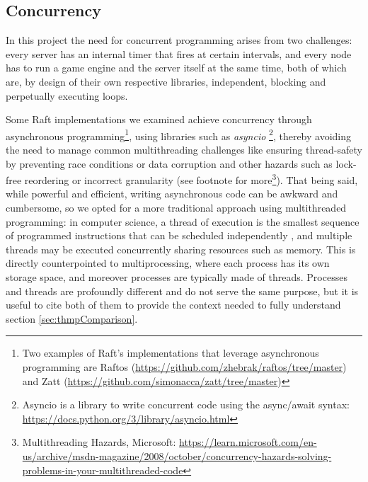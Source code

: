 \subsection{Concurrency} \label{sec:threading}

In this project the need for concurrent programming arises from two challenges: every server has an internal timer that fires at certain intervals, and every node has to run a game engine and the server itself at the same time, {both of which are, by design of their own respective libraries, independent, blocking and perpetually executing loops.}

Some Raft implementations we examined achieve concurrency through asynchronous programming\footnote{Two examples of Raft's implementations that leverage asynchronous programming are Raftos (\url{https://github.com/zhebrak/raftos/tree/master}) and Zatt (\url{https://github.com/simonacca/zatt/tree/master})}, using libraries such as \textit{asyncio} \footnote{Asyncio is a library to write concurrent code using the async/await syntax: \url{https://docs.python.org/3/library/asyncio.html}}, thereby avoiding the need to manage common multithreading challenges like ensuring thread-safety by preventing race conditions or data corruption and other hazards such as lock-free reordering or incorrect granularity (see footnote for more\footnote{Multithreading Hazards, Microsoft: \url{https://learn.microsoft.com/en-us/archive/msdn-magazine/2008/october/concurrency-hazards-solving-problems-in-your-multithreaded-code}}).
That being said, while powerful and efficient, writing asynchronous code can be awkward and cumbersome, so we opted for a more traditional approach using multithreaded programming: in computer science, a thread of execution is the smallest sequence of programmed instructions that can be {scheduled independently} \cite{lamportMultiprocessor}, and multiple threads may be executed concurrently sharing resources such as memory. {This} is directly counterpointed to multiprocessing, where each process has its own storage space, and moreover processes are typically made of threads. {Processes and threads are profoundly different and do not serve the same purpose, but it is useful to cite both of them to provide the context needed to fully understand section \ref{sec:thmpComparison}}.

